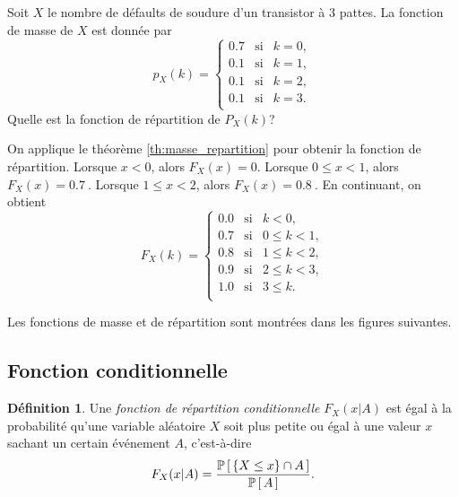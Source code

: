 \documentclass[11pt]{article}
\makeatletter
\renewcommand\P[1]{%
	\ensuremath{%
		\mathbb{P}\left[\,#1\,\right]%
	}%
}%
\theoremstyle{remark}
\theoremstyle{definition}
\newtheorem*{@definition}{Définition}
\newenvironment{definition}{%
	\begin{@definition}%
}{%
	\end{@definition}%
	\setcounter{property}{0}%
}
\makeatother
\begin{document}
\begin{exemple}
	Soit $X$ le nombre de défaults de soudure d'un transistor à 3 pattes. La
	fonction de masse de $X$ est donnée par
	\begin{equation*}
		p_X(k)=\left\{
			\begin{matrix}
				0.7 & \text{si} & k=0,\\
				0.1 & \text{si} & k=1,\\
				0.1 & \text{si} & k=2,\\
				0.1 & \text{si} & k=3.\\
			\end{matrix}
		\right.
	\end{equation*}
	Quelle est la fonction de répartition de $P_X(k)$?

	On applique le théorème \ref{th:masse_repartition} pour obtenir la
	fonction de répartition. Lorsque $x<0$, alors $F_X(x)=0$. Lorsque
	$0\leq x<1$, alors $F_X(x)=\SI{0.7}{}$. Lorsque $1\leq x<2$, alors
	$F_X(x)=\SI{0.8}{}$. En continuant, on obtient
	\begin{equation*}
		F_X(k)=\left\{
			\begin{matrix}
				0.0 & \text{si} & k<0,\\
				0.7 & \text{si} & 0\leq k<1,\\
				0.8 & \text{si} & 1\leq k<2,\\
				0.9 & \text{si} & 2\leq k<3,\\
				1.0 & \text{si} & 3\leq k.\\
			\end{matrix}
		\right.
	\end{equation*}

	Les fonctions de masse et de répartition sont montrées dans les figures
	suivantes.

	\noindent
	\begin{minipage}{0.5\textwidth}
		\begin{figure}[H]
			\centering
			
		\end{figure}
	\end{minipage}%
	\begin{minipage}{0.5\textwidth}
		\begin{figure}[H]
			\centering
			
		\end{figure}
	\end{minipage}
\end{exemple}

\subsection{Fonction conditionnelle}
\begin{definition}
	Une \textit{fonction de répartition conditionnelle} $F_X(x|A)$ est égal à 
	la probabilité qu'une variable aléatoire $X$ soit plus petite ou égal à une
	valeur $x$ sachant un certain événement $A$, c'est-à-dire
	\begin{equation*}
		F_X(x|A)=\dfrac{\P{\left\{X\leq x\right\}\cap A}}{\P{A}}.
	\end{equation*}
\end{definition}
\end{document}
